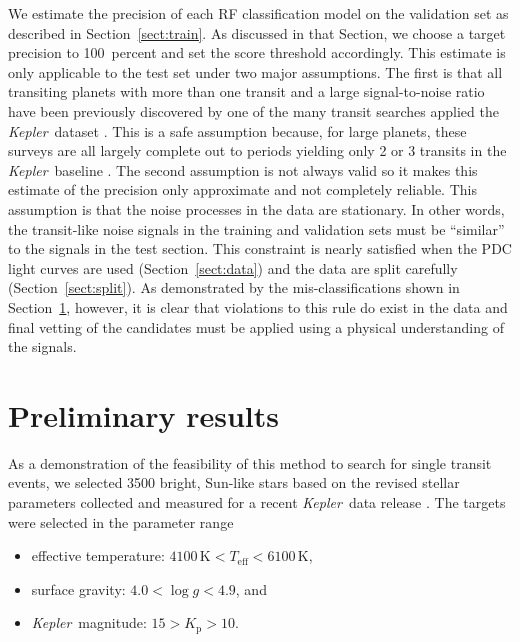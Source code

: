 \documentclass[12pt,preprint]{aastex}
\newcommand{\project}[1]{\textsl{#1}}
\newcommand{\kepler}{\project{Kepler}}
\newcommand{\sectionname}{Section}
\newcommand{\sectref}[1]{\ref{sect:#1}}
\newcommand{\Sect}[1]{\sectionname~\sectref{#1}}
\newcommand{\sect}[1]{\Sect{#1}}
\newcommand{\sectlabel}[1]{\label{sect:#1}}
\begin{document}
We estimate the precision of each RF classification model on the validation
set as described in \sect{train}.
As discussed in that \sectionname, we choose a target precision to
100~percent and set the score threshold accordingly.
This estimate is only applicable to the test set under two major assumptions.
The first is that all transiting planets with more than one transit and a
large signal-to-noise ratio have been previously discovered by one of the many
transit searches applied the \kepler\ dataset \citep{Burke:2014, Rowe:2015}.
This is a safe assumption because, for large planets, these surveys are all
largely complete out to periods yielding only 2 or 3 transits in the \kepler\
baseline \citep[for example][]{Petigura:2013}.
The second assumption is not always valid so it makes this estimate of the
precision only approximate and not completely reliable.
This assumption is that the noise processes in the data are stationary.
In other words, the transit-like noise signals in the training and validation
sets must be ``similar'' to the signals in the test section.
This constraint is nearly satisfied when the PDC light curves are used
(\sect{data}) and the data are split carefully (\sect{split}).
As demonstrated by the mis-classifications shown in \sect{demo}, however, it
is clear that violations to this rule do exist in the data and final vetting
of the candidates must be applied using a physical understanding of the
signals.


\section{Preliminary results}\sectlabel{demo}

As a demonstration of the feasibility of this method to search for single
transit events, we selected 3500 bright, Sun-like stars based on the revised
stellar parameters collected and measured for a recent \kepler\ data release
\citep{Huber:2014}.
The targets were selected in the parameter range
\begin{itemize}

\item effective temperature:
        $4100\,\mathrm{K} < T_\mathrm{eff} < 6100\,\mathrm{K}$,

\item surface gravity:  $4.0 < \log g < 4.9$, and

\item \kepler\ magnitude: $15 > K_\mathrm{p} > 10$.

\end{itemize}
\end{document}
